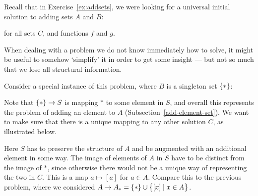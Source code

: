 Recall that in Exercise~\ref{ex:addsets}, we were looking for a universal
initial solution to adding sets $A$ and $B$:
\begin{center}
\end{center}
for all sets $C$, and functions $f$ and $g$.

When dealing with a problem we do not know immediately how to solve, it might be
useful to somehow `simplify' it in order to get some insight --- but not so much
that we lose all structural information.

Consider a special instance of this problem, where $B$ is a singleton set
$\{ \ast \}$:

\begin{center}
\end{center}

Note that $\{ \ast \} \to S$ is mapping $\ast$ to some element in $S$, and
overall this represents the problem of adding an element to $A$
(Subsection~\ref{add-element-set}). We want to make sure that there is a unique
mapping to any other solution $C$, as illustrated below.

\begin{center}
\end{center}

Here $S$ has to preserve the structure of $A$ and be augmented with an
additional element in some way. The image of elements of $A$ in $S$ have to be
distinct from the image of $\ast$, since otherwise there would not be a unique
way of representing the two in $C$. This is a map $a \mapsto [a]$ for $a \in A$.
Compare this to the previous problem, where we considered
$A \to A_\ast = \{ \ast \} \cup \big\{ [x] \mid x \in A \big\}$.

